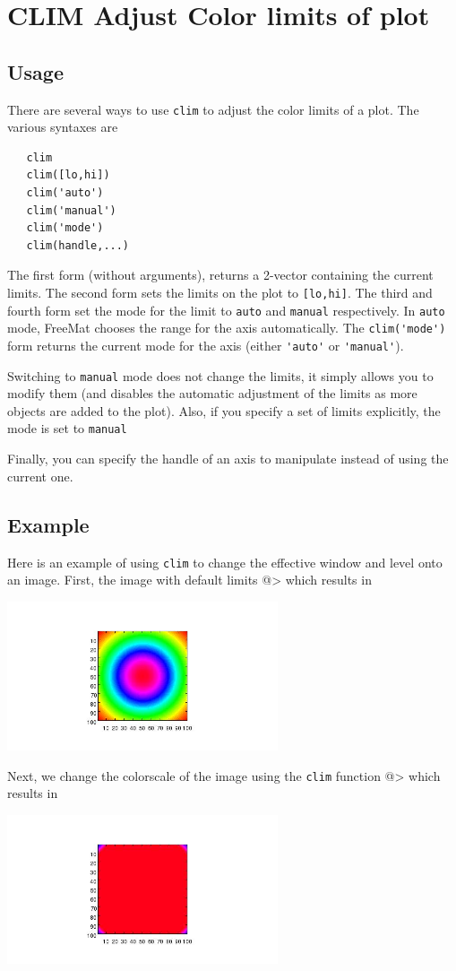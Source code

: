 \section{CLIM Adjust Color limits of plot}

\subsection{Usage}

There are several ways to use \verb|clim| to adjust the color limits of
a plot.  The various syntaxes are
\begin{verbatim}
   clim
   clim([lo,hi])   
   clim('auto')
   clim('manual')
   clim('mode')
   clim(handle,...)
\end{verbatim}
The first form (without arguments), returns a 2-vector containing the
current limits.  The second form sets the limits on the plot to \verb|[lo,hi]|.
The third and fourth form set the mode for the limit to \verb|auto| and \verb|manual|
respectively.  In \verb|auto| mode, FreeMat chooses the range for the axis 
automatically.  The \verb|clim('mode')| form returns the current mode for the axis
(either \verb|'auto'| or \verb|'manual'|).  

Switching to \verb|manual| mode does not change the limits, it simply allows
 you to modify them (and disables the automatic adjustment of the limits
as more objects are added to the plot).  Also, if you specify a set of 
limits explicitly, the mode is set to \verb|manual|
 
Finally, you can specify the handle of an
axis to manipulate instead of using the current one.
\subsection{Example}

Here is an example of using \verb|clim| to change the effective window and
level onto an image.  First, the image with default
limits
@>
which results in


\centerline{\includegraphics[width=8cm]{clim1}}

Next, we change the colorscale of the image using the
 \verb|clim| function
@>
which results in


\centerline{\includegraphics[width=8cm]{clim2}}

